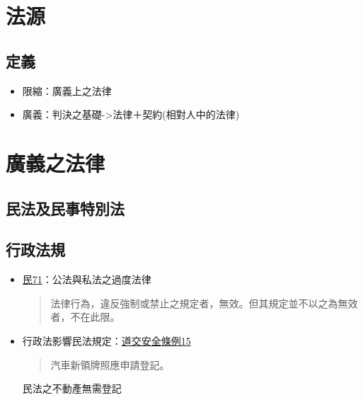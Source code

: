 \documentclass[
]{book}
\providecommand{\tightlist}{%
  \setlength{\itemsep}{0pt}\setlength{\parskip}{0pt}}
\begin{document}
\hypertarget{ux6cd5ux6e90}{%
\section{法源}\label{ux6cd5ux6e90}}

\hypertarget{ux5b9aux7fa9}{%
\subsection{定義}\label{ux5b9aux7fa9}}

\begin{itemize}
\tightlist
\item
  限縮：廣義上之法律
\item
  廣義：判決之基礎-\textgreater 法律＋契約(相對人中的法律)
\end{itemize}

\hypertarget{ux5ee3ux7fa9ux4e4bux6cd5ux5f8b}{%
\section{廣義之法律}\label{ux5ee3ux7fa9ux4e4bux6cd5ux5f8b}}

\hypertarget{ux6c11ux6cd5ux53caux6c11ux4e8bux7279ux5225ux6cd5}{%
\subsection{民法及民事特別法}\label{ux6c11ux6cd5ux53caux6c11ux4e8bux7279ux5225ux6cd5}}

\hypertarget{ux884cux653fux6cd5ux898f}{%
\subsection{行政法規}\label{ux884cux653fux6cd5ux898f}}

\begin{itemize}
\item
  \href{https://law.moj.gov.tw/LawClass/LawSingle.aspx?pcode=B0000001\&flno=71}{民71}：公法與私法之過度法律

  \begin{quote}
  法律行為，違反強制或禁止之規定者，無效。但其規定並不以之為無效者，不在此限。
  \end{quote}
\item
  行政法影響民法規定：\href{https://law.moj.gov.tw/LawClass/LawSingle.aspx?pcode=K0040013\&flno=15}{道交安全條例15}

  \begin{quote}
  汽車新領牌照應申請登記。
  \end{quote}

  民法之不動產無需登記
\end{itemize}
\end{document}
